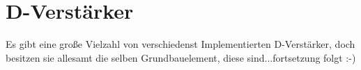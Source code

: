 \documentclass[a4paper,bibtotoc,oneside]{scrbook}
\begin{document}
\newpage





\tableofcontents\thispagestyle{empty}
\newpage

\setcounter{page}{1}

\chapter[Recherche über Klasse D-Verstärker]{D-Verstärker}
Es gibt eine große Vielzahl von verschiedenst Implementierten D-Verstärker, doch besitzen sie allesamt die selben
Grundbauelement, diese sind...fortsetzung folgt :-)
\end{document}

